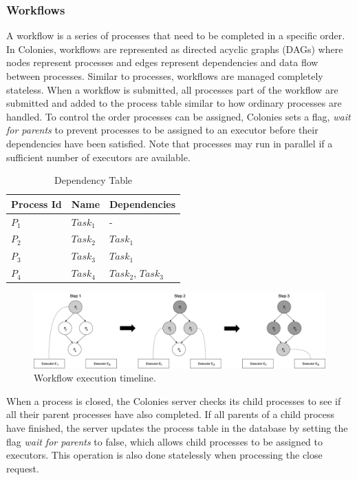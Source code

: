 \documentclass{article}
\begin{document}
\subsubsection{Workflows}
A workflow is a series of processes that need to be completed in a specific order. In Colonies, workflows are represented as directed acyclic graphs (DAGs) where nodes represent processes and edges represent dependencies and data flow between processes. Similar to processes, workflows are managed completely stateless. When a workflow is submitted, all processes part of the workflow are submitted and added to the process table similar to how ordinary processes are handled. To control the order processes can be assigned, Colonies sets a flag, \emph{wait for parents} to prevent processes to be assigned to an executor before their dependencies have been satisfied. Note that processes may run in parallel if a sufficient number of executors are available.

\begin{table}[h]
	\caption{Dependency Table}
	\centering
	\begin{tabular}{lll}
		\toprule
		\cmidrule(r){1-2}
        Process Id & Name       & Dependencies           \\
		\midrule
        $P_{1}$    & $Task_{1}$ & -                      \\
        $P_{2}$    & $Task_{2}$ & $Task_{1}$             \\
        $P_{3}$    & $Task_{3}$ & $Task_{1}$             \\
        $P_{4}$    & $Task_{4}$ & $Task_{2}$, $Task_{3}$ \\
		\bottomrule
	\end{tabular}
	\label{deptable}
\end{table}

\begin{figure}[h]
	\centering
    \includegraphics[scale=0.30]{workflow.png}
	\caption{Workflow execution timeline.}
	\label{fig:workflowexec}
\end{figure}

When a process is closed, the Colonies server checks its child processes to see if all their parent processes have also completed. If all parents of a child process have finished, the server updates the process table in the database by setting the flag \emph{wait for parents} to false, which allows child processes to be assigned to executors. This operation is also done statelessly when processing the close request. 
\end{document}
